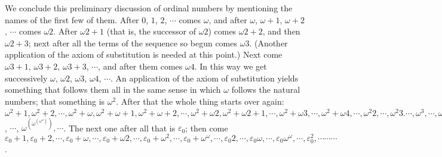 We conclude this preliminary discussion of ordinal numbers by mentioning the names of the first few of them. After $0$, $1$, $2$, $\cdots$ comes $\omega$, and after $\omega$, $\omega + 1$, $\omega + 2$, $\cdots$ comes $\omega 2$. After $\omega 2 + 1$ (that is, the successor of $\omega 2$) comes $\omega 2 + 2$, and then $\omega 2 + 3$; next after all the terms of the sequence so begun comes $\omega 3$. (Another application of the axiom of substitution is needed at this point.) Next come $\omega 3 + 1$, $\omega 3 + 2$, $\omega 3 + 3$, $\cdots$, and after them comes $\omega 4$. In this way we get successively $\omega$, $\omega 2$, $\omega 3$, $\omega 4$, $\cdots$. An application of the axiom of substitution yields something that follows them all in the same sense in which $\omega$ follows the natural numbers; that something is $\omega^{2}$. After that the whole thing starts over again: $\omega^{2} + 1, \omega^{2} + 2, \cdots, \omega^{2} + \omega, \omega^{2} + \omega + 1, \omega^{2} + \omega + 2, \cdots , \omega^{2} + \omega 2, \omega^{2} + \omega 2 + 1, \cdots , \omega^{2} + \omega 3, \cdots, \omega^{2} + \omega 4, \cdots, \omega^{2} 2, \cdots, \omega^{2} 3. \cdots, \omega^{3}, \cdots, \omega^{4}, \cdots, \omega^{\omega}, \cdots, \omega^{(\omega^{\omega})}$, $ \cdots$, $ \omega^{(\omega^{(\omega^{\omega})})} , \cdots $. The next one after all that is $\varepsilon_{0}$; then come $\varepsilon_{0} + 1, \varepsilon_{0} +2, \cdots, \varepsilon_{0} + \omega, \cdots, \varepsilon_{0} + \omega 2, \cdots, \varepsilon_{0} + \omega^{2}, \cdots, \varepsilon_{0} + \omega^{\omega}, \cdots, \varepsilon_{0} 2, \cdots, \varepsilon_{0} \omega, \cdots, \varepsilon_{0} \omega^{\omega}, \cdots, \varepsilon_{0}^{2}, \cdots \cdots \cdots$.